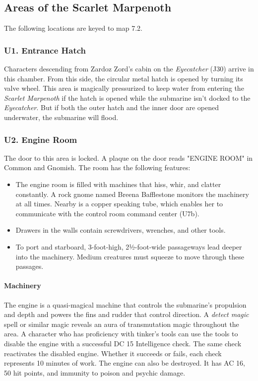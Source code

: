 \documentclass[10pt,a4paper,twoside,twocolumn,openany,nodeprecatedcode]{dndbook}
\begin{document}
\subsection{Areas of the Scarlet Marpenoth}
The following locations are keyed to map 7.2.
\subsubsection{U1. Entrance Hatch}
Characters descending from Zardoz Zord's cabin on the \textit{Eyecatcher} (J30) arrive in this chamber. From this side, the circular metal hatch is opened by turning its valve wheel. This area is magically pressurized to keep water from entering the \textit{Scarlet Marpenoth} if the hatch is opened while the submarine isn't docked to the \textit{Eyecatcher}. But if both the outer hatch and the inner door are opened underwater, the submarine will flood.
\subsubsection{U2. Engine Room}
The door to this area is locked. A plaque on the door reads "ENGINE ROOM" in Common and Gnomish. The room has the following features:
\begin{itemize}

\item The engine room is filled with machines that hiss, whir, and clatter constantly. A rock gnome named Breena Bafflestone monitors the machinery at all times. Nearby is a copper speaking tube, which enables her to communicate with the control room command center (U7b).
\item Drawers in the walls contain screwdrivers, wrenches, and other tools.
\item To port and starboard, 3-foot-high, 2½-foot-wide passageways lead deeper into the machinery. Medium creatures must squeeze to move through these passages.
\end{itemize}


\paragraph{Machinery}
The engine is a quasi-magical machine that controls the submarine's propulsion and depth and powers the fins and rudder that control direction. A \textit{detect magic} spell or similar magic reveals an aura of transmutation magic throughout the area.
A character who has proficiency with tinker's tools can use the tools to disable the engine with a successful DC 15 Intelligence check. The same check reactivates the disabled engine. Whether it succeeds or fails, each check represents 10 minutes of work. The engine can also be destroyed. It has AC 16, 50 hit points, and immunity to poison and psychic damage.
\end{document}
